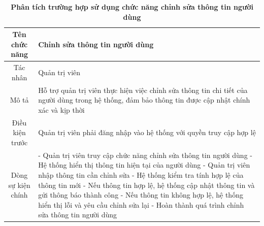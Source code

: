 \begin{table}[H]
	\caption{\bfseries \fontsize{12pt}{0pt}\selectfont Phân tích trường hợp sử dụng chức năng chỉnh sửa thông tin người dùng}
	\centering
	\begin{tabularx}{0.9\textwidth}{|c|X|}
		\hline
		\textbf{Tên chức năng} & \textbf{Chỉnh sửa thông tin người dùng}                                                                                                               \\
		\hline
		Tác nhân               & Quản trị viên                                                                                                                                         \\
		\hline
		Mô tả                  & Hỗ trợ quản trị viên thực hiện việc chỉnh sửa thông tin chi tiết của người dùng trong hệ thống, đảm bảo thông tin được cập nhật chính xác và kịp thời \\
		\hline
		Điều kiện trước        & Quản trị viên phải đăng nhập vào hệ thống với quyền truy cập hợp lệ                                                                                   \\
		\hline
		Dòng sự kiện chính     &
		- Quản trị viên truy cập chức năng chỉnh sửa thông tin người dùng \newline
		- Hệ thống hiển thị thông tin hiện tại của người dùng \newline
		- Quản trị viên nhập thông tin cần chỉnh sửa \newline
		- Hệ thống kiểm tra tính hợp lệ của thông tin mới \newline
		- Nếu thông tin hợp lệ, hệ thống cập nhật thông tin và gửi thông báo thành công \newline
		- Nếu thông tin không hợp lệ, hệ thống hiển thị lỗi và yêu cầu chỉnh sửa lại    \newline
		- Hoàn thành quá trình chỉnh sửa thông tin người dùng                                                                                                                          \\
		\hline
	\end{tabularx}
\end{table}

